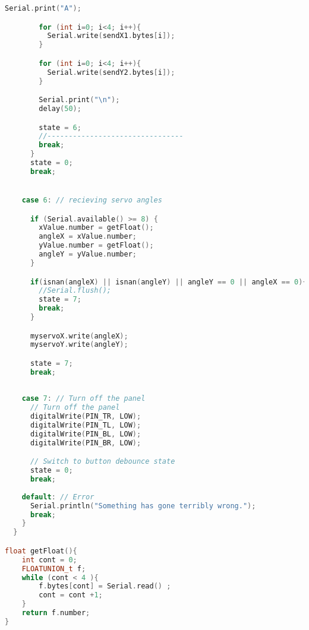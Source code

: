 \begin{lstlisting}[language=C++ , caption= Arduino full code for controlling the system by a simulink controller]
        Serial.print("A");

        for (int i=0; i<4; i++){
          Serial.write(sendX1.bytes[i]); 
        }

        for (int i=0; i<4; i++){
          Serial.write(sendY2.bytes[i]); 
        }

        Serial.print("\n");
        delay(50);

        state = 6;
        //--------------------------------
        break;
      }
      state = 0;
      break;


    case 6: // recieving servo angles

      if (Serial.available() >= 8) {
        xValue.number = getFloat();
        angleX = xValue.number;
        yValue.number = getFloat();
        angleY = yValue.number;
      }

      if(isnan(angleX) || isnan(angleY) || angleY == 0 || angleX == 0){
        //Serial.flush();
        state = 7;
        break;
      }

      myservoX.write(angleX); 
      myservoY.write(angleY);

      state = 7;
      break;
    
    
    case 7: // Turn off the panel
      // Turn off the panel
      digitalWrite(PIN_TR, LOW);
      digitalWrite(PIN_TL, LOW);
      digitalWrite(PIN_BL, LOW);
      digitalWrite(PIN_BR, LOW);

      // Switch to button debounce state
      state = 0;
      break;
      
    default: // Error
      Serial.println("Something has gone terribly wrong.");
      break;
    }
  }

float getFloat(){
    int cont = 0;
    FLOATUNION_t f;
    while (cont < 4 ){
        f.bytes[cont] = Serial.read() ;
        cont = cont +1;
    } 
    return f.number;
}
\end{lstlisting}

